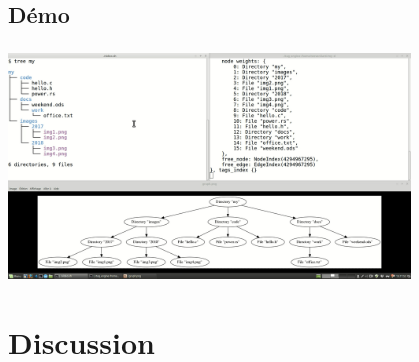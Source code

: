 \documentclass[10pt]{beamer}
\begin{document}
\subsection{Démo}
\begin{frame}
    \frametitle{\subsecname}
    \begin{center}
        \includegraphics[width=0.8\textwidth]{images/video.png}
        \bigbreak
    \end{center}
\end{frame}

\section{Discussion}
\end{document}
